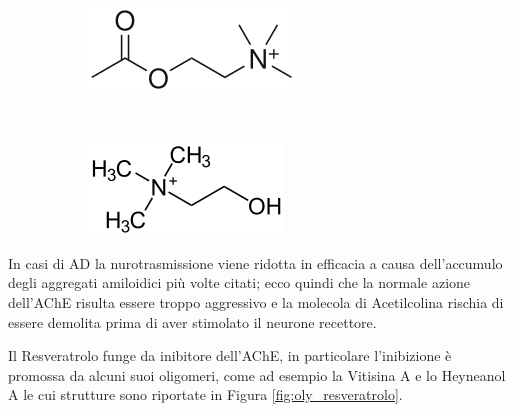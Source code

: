 \documentclass[a4paper, 12pt]{article}
\begin{document}
\begin{figure}[H]
	\centering
	\begin{subfigure}[b]{0.4\linewidth}
		\includegraphics[width=\linewidth]{immagini/acetilcolina.png}
	\end{subfigure}
	~
	\begin{subfigure}[b]{0.4\linewidth}
		\includegraphics[width=\linewidth]{immagini/colina.png}
	\end{subfigure}
	\label{fig:coline}
\end{figure}

In casi di AD la nurotrasmissione viene ridotta in efficacia a causa dell'accumulo degli aggregati amiloidici più volte citati; ecco quindi che la normale azione dell'AChE risulta essere troppo aggressivo e la molecola di Acetilcolina rischia di essere demolita prima di aver stimolato il neurone recettore.

Il Resveratrolo funge da inibitore dell'AChE, in particolare l'inibizione è promossa da alcuni suoi oligomeri, come ad esempio la Vitisina A e lo Heyneanol A le cui strutture sono riportate in Figura \ref{fig:oly_resveratrolo}.
\end{document}
